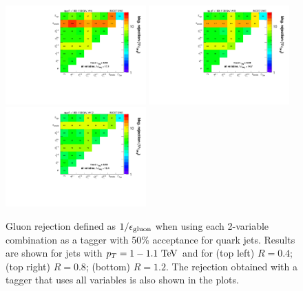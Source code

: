 %
\begin{figure}
\centering
\includegraphics[width=0.48\textwidth]{./Figures/QGTagging/pT1000/AKtR04/effBkg2D.pdf}
\includegraphics[width=0.48\textwidth]{./Figures/QGTagging/pT1000/AKtR08/effBkg2D.pdf}
\includegraphics[width=0.48\textwidth]{./Figures/QGTagging/pT1000/AKtR12/effBkg2D.pdf}
\caption{Gluon rejection defined as $1/\epsilon_{\rm gluon}$ when using each 2-variable combination 
as a tagger with 50\% acceptance for quark jets. Results are shown for
jets with $\pt=1-1.1 \TeV$ and
for (top left) $R=0.4$; (top right) $R=0.8$; (bottom) $R=1.2$. The rejection obtained with a tagger that uses all variables is also shown
in the plots. }
\label{fig:qg_pt1000_comb}
\end{figure}
%



